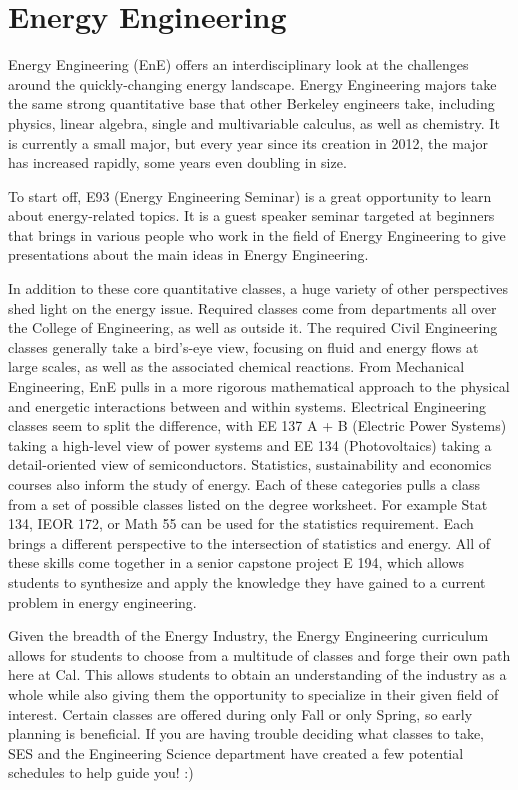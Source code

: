\chapter*{Energy Engineering}

Energy Engineering (EnE) offers an interdisciplinary look at the challenges around the quickly-changing energy landscape. Energy Engineering majors take the same strong quantitative base that other Berkeley engineers take, including physics, linear algebra, single and multivariable calculus, as well as chemistry. It is currently a small major, but every year since its creation in 2012, the major has increased rapidly, some years even doubling in size.

To start off, E93 (Energy Engineering Seminar) is a great opportunity to learn about energy-related topics. It is a guest speaker seminar targeted at beginners that brings in various people who work in the field of Energy Engineering to give presentations about the main ideas in Energy Engineering.

In addition to these core quantitative classes, a huge variety of other perspectives shed light on the energy issue. Required classes come from departments all over the College of Engineering, as well as outside it. The required Civil Engineering classes generally take a bird’s-eye view, focusing on fluid and energy flows at large scales, as well as the associated chemical reactions. From Mechanical Engineering, EnE pulls in a more rigorous mathematical approach to the physical and energetic interactions between and within systems. Electrical Engineering classes seem to split the difference, with EE 137 A + B (Electric Power Systems) taking a high-level view of power systems and EE 134 (Photovoltaics) taking a detail-oriented view of semiconductors. Statistics, sustainability and economics courses also inform the study of energy. Each of these categories pulls a class from a set of possible classes listed on the degree worksheet. For example Stat 134, IEOR 172, or Math 55 can be used for the statistics requirement. Each brings a different perspective to the intersection of statistics and energy. All of these skills come together in a senior capstone project E 194, which allows students to synthesize and apply the knowledge they have gained to a current problem in energy engineering.

Given the breadth of the Energy Industry, the Energy Engineering curriculum allows for students to choose from a multitude of classes and forge their own path here at Cal. This allows students to obtain an understanding of the industry as a whole while also giving them the opportunity to specialize in their given field of interest. Certain classes are offered during only Fall or only Spring, so early planning is beneficial.
If you are having trouble deciding what classes to take, SES and the Engineering Science department have created a few potential schedules to help guide you! :)
 
